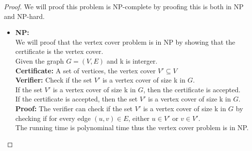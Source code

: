 \documentclass{article}
\begin{document}
\begin{proof}
    We will proof this problem is NP-complete by proofing this is both in NP and NP-hard.
    \begin{itemize}
        \item \textbf{NP:} \\
        We will proof that the vertex cover problem is in NP by showing that the certificate is the vertex cover.\\
        Given the graph $G = (V,E)$ and k is interger.\\
        \textbf{Certificate:} A set of vertices, the vertex cover $V'\subseteq V$\\
        \textbf{Verifier:} Check if the set $V'$ is a vertex cover of size k in $G$.\\
        If the set $V'$ is a vertex cover of size k in $G$, then the certificate is accepted.\\
        If the certificate is accepted, then the set $V'$ is a vertex cover of size k in $G$.\\
        \textbf{Proof:} The verifier can check if the set $V'$ is a vertex cover of size k in $G$ by checking if for every edge $(u,v) \in E$, either $u \in V'$ or $v \in V'$.\\
        The running time is polynominal time thus the vertex cover problem is in NP.


\end{itemize}
\end{proof}
\end{document}
